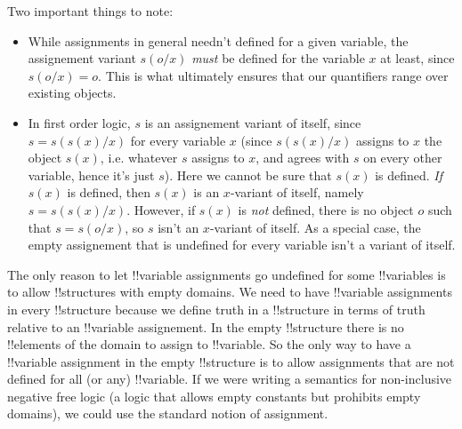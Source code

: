 \documentclass[../../../include/open-logic-section]{subfiles}
\begin{document}
Two important things to note:
\begin{itemize}
\item While assignments in general needn't defined for a given variable,
  the assignement variant $s(o/x)$ \emph{must} be defined for the 
  variable $x$ at least, since $s(o/x)=o$. This is what ultimately
  ensures that our quantifiers range over existing objects.
\item In first order logic, $s$ is an assignement variant of itself,
  since $s=s(s(x)/x)$ for every variable $x$ (since $s(s(x)/x)$
  assigns to $x$ the object $s(x)$, i.e. whatever $s$ assigns to $x$,
  and agrees with $s$ on every other variable, hence it's just $s$).
  Here we cannot be sure that $s(x)$ is defined. \emph{If} $s(x)$ is defined,
  then $s(x)$ is an $x$-variant of itself, namely $s=s(s(x)/x)$.
  However, if $s(x)$ is \emph{not} defined, there is no object $o$ such 
  that $s=s(o/x)$, so $s$ isn't an $x$-variant of itself. As a special
  case, the empty assignement that is undefined for every variable
  isn't a variant of itself.
\end{itemize}

\begin{explain}
The only reason to let !!{variable} assignments go undefined
for some !!{variable}s is to allow !!{structure}s with empty domains.
We need to have !!{variable} assignments in  every !!{structure}
because we define truth in a !!{structure} in terms of truth relative
to an !!{variable} assignement. In the empty !!{structure} there is
no !!{element}s of the domain to assign to !!{variable}. So the only
way to have a !!{variable} assignment in the empty !!{structure} is to
allow assignments that are not defined for all (or any) !!{variable}.
If we were writing a semantics for non-inclusive negative free logic 
(a logic that allows empty constants but prohibits empty domains),
we could use the standard notion of assignment.
\end{explain}
\end{document}
